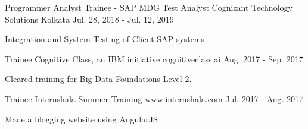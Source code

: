 


\begin{cventries}




\cventry
{Programmer Analyst Trainee - SAP MDG Test Analyst} %
{Cognizant Technology Solutions} %
{Kolkata} %
{Jul. 28, 2018 - Jul. 12, 2019} %
{ %
\begin{cvitems}
\item {Integration and System Testing of Client SAP systems}
\end{cvitems}
}


\cventry
{Trainee} %
{Cognitive Class, an IBM initiative} %
{cognitiveclass.ai} %
{Aug. 2017 - Sep. 2017} %
{ %
\begin{cvitems}
\item {Cleared training for Big Data Foundations-Level 2.}
\end{cvitems}
}


\cventry
{Trainee} %
{Internshala Summer Training} %
{www.internshala.com} %
{Jul. 2017 - Aug. 2017} %
{ %
\begin{cvitems}
\item {Made a blogging website using AngularJS}
\end{cvitems}
}


\end{cventries}